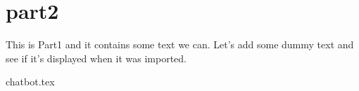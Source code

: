 \section{part2}
This is Part1 and it contains some text we can. Let's add some dummy text 
and see if it's displayed when it was imported.

{chatbot.tex}
\blindtext[5]
